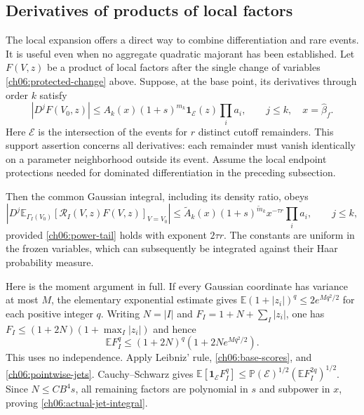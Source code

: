 \subsection{Derivatives of products of local factors}
\label{ch06:bounded-jet-route}

The local expansion offers a direct way to combine differentiation
and rare events. It is useful even when no aggregate quadratic majorant
has been established. Let $F(V,z)$ be a product of local factors after the
single change of variables \eqref{ch06:protected-change} above. Suppose, at the base point, its derivatives
through order $k$ satisfy
\begin{equation}
 |D^jF(V_0,z)|\le A_k(x)(1+s)^{m_k}
       \mathbf1_{\mathcal E}(z)\prod_i a_i,\qquad j\le k,
 \quad x=\widehat\beta_f .
 \label{ch06:pointwise-jets}
\end{equation}
Here $\mathcal E$ is the intersection of the events for $r$ distinct
cutoff remainders. This support assertion concerns all derivatives:
each remainder must vanish identically on a parameter neighborhood
outside its event. Assume the local endpoint protections needed for
dominated differentiation in the preceding subsection.

Then the common Gaussian integral, including its density ratio, obeys
\begin{equation}
 \left|D^j\mathbb E_{\Gamma_I(V_0)}
                  [\mathcal R_I(V,z)F(V,z)]_{V=V_0}\right|
 \le \widetilde A_k(x)(1+s)^{\widetilde m_k}
                   x^{-\tau r}\prod_i a_i,\qquad j\le k,
 \label{ch06:actual-jet-integral}
\end{equation}
provided \eqref{ch06:power-tail} holds with exponent $2\tau r$.
The constants are uniform in the frozen variables, which can subsequently
be integrated against their Haar probability measure.

Here is the moment argument in full. If every Gaussian coordinate has
variance at most $M$, the elementary exponential estimate gives
$\mathbb E(1+|z_i|)^q\le2e^{Mq^2/2}$ for each positive integer $q$.
Writing $N=|I|$ and $F_I=1+N+\sum_I|z_i|$, one has
$F_I\le(1+2N)(1+\max_I|z_i|)$ and hence
\[
 \mathbb E F_I^q\le(1+2N)^q(1+2N e^{Mq^2/2}).
\]
This uses no independence. Apply Leibniz' rule,
\eqref{ch06:base-scores}, and \eqref{ch06:pointwise-jets}.
Cauchy--Schwarz gives
$\mathbb E[\mathbf1_{\mathcal E}F_I^q]
 \le\mathbb P(\mathcal E)^{1/2}(\mathbb E F_I^{2q})^{1/2}$.
Since $N\le CB^4s$, all remaining factors are polynomial in $s$ and
subpower in $x$, proving \eqref{ch06:actual-jet-integral}.

